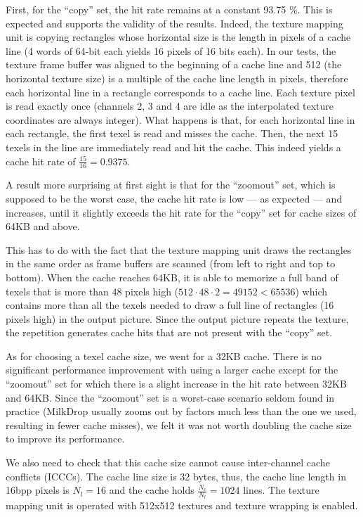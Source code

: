 \documentclass[a4paper,11pt]{kthesis}
\begin{document}
First, for the ``copy'' set, the hit rate remains at a constant 93.75 \%. This is expected and supports the validity of the results. Indeed, the texture mapping unit is copying rectangles whose horizontal size is the length in pixels of a cache line (4 words of 64-bit each yields 16 pixels of 16 bits each). In our tests, the texture frame buffer was aligned to the beginning of a cache line and 512 (the horizontal texture size) is a multiple of the cache line length in pixels, therefore each horizontal line in a rectangle corresponds to a cache line. Each texture pixel is read exactly once (channels 2, 3 and 4 are idle as the interpolated texture coordinates are always integer). What happens is that, for each horizontal line in each rectangle, the first texel is read and misses the cache. Then, the next 15 texels in the line are immediately read and hit the cache. This indeed yields a cache hit rate of $\frac{15}{16} = 0.9375$.

A result more surprising at first sight is that for the ``zoomout'' set, which is supposed to be the worst case, the cache hit rate is low --- as expected --- and increases, until it slightly exceeds the hit rate for the ``copy'' set for cache sizes of 64KB and above.

This has to do with the fact that the texture mapping unit draws the rectangles in the same order as frame buffers are scanned (from left to right and top to bottom). When the cache reaches 64KB, it is able to memorize a full band of texels that is more than 48 pixels high ($512\cdot48\cdot2 = 49152 < 65536$) which contains more than all the texels needed to draw a full line of rectangles (16 pixels high) in the output picture. Since the output picture repeats the texture, the repetition generates cache hits that are not present with the ``copy'' set.

As for choosing a texel cache size, we went for a 32KB cache. There is no significant performance improvement with using a larger cache except for the ``zoomout'' set for which there is a slight increase in the hit rate between 32KB and 64KB. Since the ``zoomout'' set is a worst-case scenario seldom found in practice (MilkDrop usually zooms out by factors much less than the one we used, resulting in fewer cache misses), we felt it was not worth doubling the cache size to improve its performance.

We also need to check that this cache size cannot cause inter-channel cache conflicts (ICCCs). The cache line size is 32 bytes, thus, the cache line length in 16bpp pixels is $N_{l} = 16$ and the cache holds $\frac{N_{c}}{N_{l}}=1024$ lines. The texture mapping unit is operated with 512x512 textures and texture wrapping is enabled.
\end{document}
